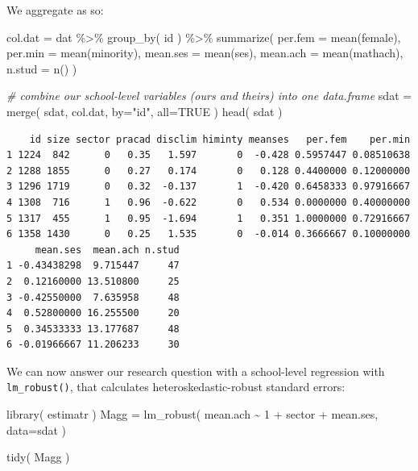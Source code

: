 \documentclass[
  letterpaper,
  DIV=11,
  numbers=noendperiod]{scrreprt}
\newenvironment{Shaded}{\begin{snugshade}}{\end{snugshade}}
\newcommand{\AttributeTok}[1]{\textcolor[rgb]{0.49,0.56,0.16}{#1}}
\newcommand{\CommentTok}[1]{\textcolor[rgb]{0.38,0.63,0.69}{\textit{#1}}}
\newcommand{\ConstantTok}[1]{\textcolor[rgb]{0.53,0.00,0.00}{#1}}
\newcommand{\DecValTok}[1]{\textcolor[rgb]{0.25,0.63,0.44}{#1}}
\newcommand{\FunctionTok}[1]{\textcolor[rgb]{0.02,0.16,0.49}{#1}}
\newcommand{\NormalTok}[1]{\textcolor[rgb]{0.00,0.44,0.13}{#1}}
\newcommand{\OtherTok}[1]{\textcolor[rgb]{0.00,0.44,0.13}{#1}}
\newcommand{\SpecialCharTok}[1]{\textcolor[rgb]{0.25,0.44,0.63}{#1}}
\newcommand{\StringTok}[1]{\textcolor[rgb]{0.25,0.44,0.63}{#1}}
\begin{document}
We aggregate as so:

\begin{Shaded}
\begin{Highlighting}[]
\NormalTok{col.dat }\OtherTok{=}\NormalTok{ dat }\SpecialCharTok{\%\textgreater{}\%} \FunctionTok{group\_by}\NormalTok{( id ) }\SpecialCharTok{\%\textgreater{}\%} 
    \FunctionTok{summarize}\NormalTok{( }\AttributeTok{per.fem =} \FunctionTok{mean}\NormalTok{(female),}
                 \AttributeTok{per.min =} \FunctionTok{mean}\NormalTok{(minority),}
                 \AttributeTok{mean.ses =} \FunctionTok{mean}\NormalTok{(ses),}
                 \AttributeTok{mean.ach =} \FunctionTok{mean}\NormalTok{(mathach),}
                 \AttributeTok{n.stud =} \FunctionTok{n}\NormalTok{() )}

\CommentTok{\# combine our school{-}level variables (ours and theirs) into one data.frame}
\NormalTok{sdat }\OtherTok{=} \FunctionTok{merge}\NormalTok{( sdat, col.dat, }\AttributeTok{by=}\StringTok{"id"}\NormalTok{, }\AttributeTok{all=}\ConstantTok{TRUE}\NormalTok{ )}
\FunctionTok{head}\NormalTok{( sdat )}
\end{Highlighting}
\end{Shaded}

\begin{verbatim}
    id size sector pracad disclim himinty meanses   per.fem    per.min
1 1224  842      0   0.35   1.597       0  -0.428 0.5957447 0.08510638
2 1288 1855      0   0.27   0.174       0   0.128 0.4400000 0.12000000
3 1296 1719      0   0.32  -0.137       1  -0.420 0.6458333 0.97916667
4 1308  716      1   0.96  -0.622       0   0.534 0.0000000 0.40000000
5 1317  455      1   0.95  -1.694       1   0.351 1.0000000 0.72916667
6 1358 1430      0   0.25   1.535       0  -0.014 0.3666667 0.10000000
     mean.ses  mean.ach n.stud
1 -0.43438298  9.715447     47
2  0.12160000 13.510800     25
3 -0.42550000  7.635958     48
4  0.52800000 16.255500     20
5  0.34533333 13.177687     48
6 -0.01966667 11.206233     30
\end{verbatim}

We can now answer our research question with a school-level regression
with \texttt{lm\_robust()}, that calculates heteroskedastic-robust
standard errors:

\begin{Shaded}
\begin{Highlighting}[]
\FunctionTok{library}\NormalTok{( estimatr )}
\NormalTok{Magg }\OtherTok{=} \FunctionTok{lm\_robust}\NormalTok{( mean.ach }\SpecialCharTok{\textasciitilde{}} \DecValTok{1} \SpecialCharTok{+}\NormalTok{ sector }\SpecialCharTok{+}\NormalTok{ mean.ses, }\AttributeTok{data=}\NormalTok{sdat )}

\FunctionTok{tidy}\NormalTok{( Magg )}
\end{Highlighting}
\end{Shaded}
\end{document}
